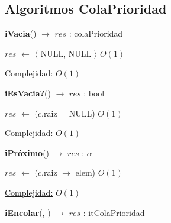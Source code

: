 \begin{Algoritmos}
\subsection{Algoritmos ColaPrioridad}


\begin{algorithm}[H]
{\textbf{iVacia}() $\to$ $res$ : colaPrioridad}
\begin{algorithmic}[1]
    \State $res$ $\gets$  $\langle$ NULL, NULL $\rangle$   \Comment $O(1)$

    \medskip
    \Statex \underline{Complejidad:} $O(1)$
\end{algorithmic}
\end{algorithm}
   

\begin{algorithm}[H]
{\textbf{iEsVacia?}() $\to$ $res$ : bool}
\begin{algorithmic}[1]
    \State $res$ $\gets$ ($c$.raiz = NULL) \Comment $O(1)$

    \medskip
    \Statex \underline{Complejidad:} $O(1)$
\end{algorithmic}
\end{algorithm}


\begin{algorithm}[H]
{\textbf{iPr\'oximo}() $\to$ $res$ : $\alpha$}
\begin{algorithmic}[1]
    \State $res$ $\gets$ ($c$.raiz $\rightarrow$ elem) \Comment $O(1)$

    \medskip
    \Statex \underline{Complejidad:} $O(1)$
\end{algorithmic}
\end{algorithm}
 

\begin{algorithm}[H]
{\textbf{iEncolar}(, ) $\to$ $res$ : itColaPrioridad}
\begin{algorithmic}[1]


\end{algorithmic}
\end{algorithm}
\end{Algoritmos}
